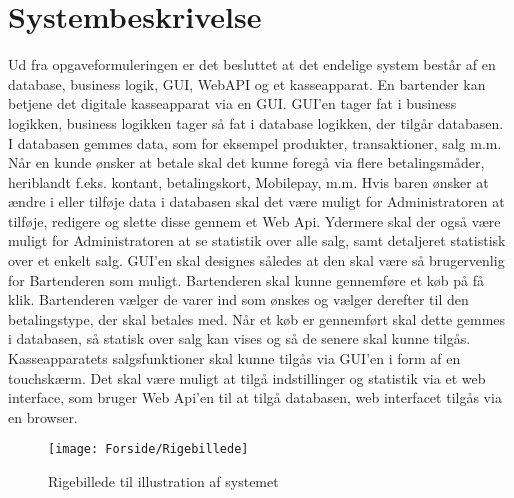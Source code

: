 \chapter{Systembeskrivelse}
Ud fra opgaveformuleringen er det besluttet at det endelige system består af en database, business logik, \gls{GUI}, \gls{WebAPI} og et kasseapparat. 
\newline
\newline
En bartender kan betjene det digitale kasseapparat via en \gls{GUI}. \gls{GUI}'en tager fat i business logikken, business logikken tager så fat i database logikken, der tilgår databasen. I databasen gemmes data, som for eksempel produkter, transaktioner, salg m.m.
Når en kunde ønsker at betale skal det kunne foregå via flere betalingsmåder, heriblandt f.eks. kontant, betalingskort, Mobilepay, m.m.
\newline
\newline
Hvis baren ønsker at ændre i eller tilføje data i databasen skal det være muligt for Administratoren at tilføje, redigere og slette disse gennem et Web Api. Ydermere skal der også være muligt for Administratoren at se statistik over alle salg, samt detaljeret statistisk over et enkelt salg. 
\newline
\newline
GUI'en skal designes således at den skal være så brugervenlig for Bartenderen som muligt. Bartenderen skal kunne gennemføre et køb på få klik. Bartenderen vælger de varer ind som ønskes og vælger derefter til den betalingstype, der skal betales med. Når et køb er gennemført skal dette gemmes i databasen, så statisk over salg kan vises og så de senere skal kunne tilgås. 
\newline
\newline
Kasseapparatets salgsfunktioner skal kunne tilgås via \gls{GUI}'en i form af en touchskærm. Det skal være muligt at tilgå indstillinger og statistik via et web interface, som bruger Web Api'en til at tilgå databasen, web interfacet tilgås via en browser. 
                  
\begin{figure}[h]
    \centering
    \texttt{[image: Forside/Rigebillede]}
    \caption{Rigebillede til illustration af systemet}
    \label{fig:rig_billede}
\end{figure} 


